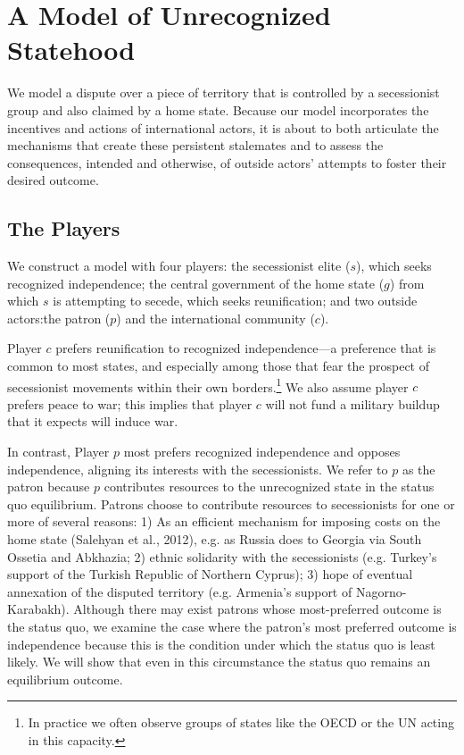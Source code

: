 \section{A Model of Unrecognized Statehood} 
We model a dispute over a piece of territory that is controlled by a secessionist group and also claimed by a home state. Because our model incorporates the incentives and actions of international actors, it is about to both articulate the mechanisms that create these persistent stalemates and to assess the consequences, intended and otherwise, of outside actors' attempts to foster their desired outcome.

\subsection{The Players}

We construct a model with four players: the secessionist elite ($s$), which seeks recognized independence; the central government of the home state ($g$) from which $s$ is attempting to secede, which seeks reunification; and two outside actors:the patron ($p$) and the international community ($c$).

Player $c$ prefers reunification to recognized independence---a preference that is common to most states, and especially among those that fear the prospect of secessionist movements within their own borders.\footnote{In practice we often observe groups of states like the OECD or the UN acting in this capacity.} We also assume player $c$ prefers peace to war; this implies that player $c$ will not fund a military buildup that it expects will induce war.

In contrast, Player $p$ most prefers recognized independence and opposes independence, aligning its interests with the secessionists. We refer to $p$ as the patron because $p$ contributes resources to the unrecognized state in the status quo equilibrium. Patrons choose to contribute resources to secessionists for one or more of several reasons: 1) As an efficient mechanism for imposing costs on the home state (Salehyan et al., 2012), e.g. as Russia does to Georgia via South Ossetia and Abkhazia; 2) ethnic solidarity with the secessionists (e.g. Turkey's support of the Turkish Republic of Northern Cyprus); 3) hope of eventual annexation of the disputed territory (e.g. Armenia's support of Nagorno-Karabakh). Although there may exist patrons whose most-preferred outcome is the status quo, we examine the case where the patron's most preferred outcome is independence because this is the condition under which the status quo is least likely. We will show that even in this circumstance the status quo remains an equilibrium outcome.

